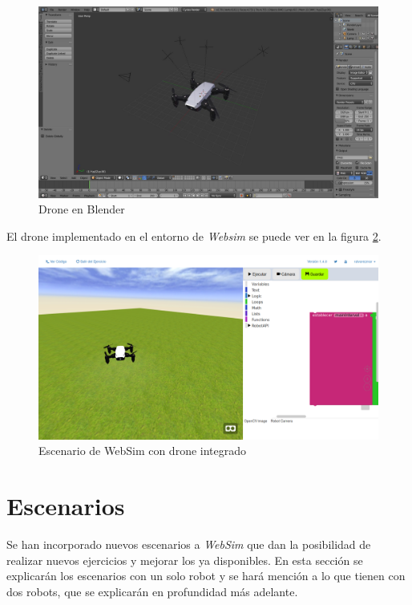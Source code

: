  \begin{figure}
    \centering
    \includegraphics[scale=0.3]{img/droneBlender.jpg}
    \caption{Drone en Blender} \label{fig:droneBlender}
\end{figure}

El drone implementado en el entorno de \textit{Websim} se puede ver en la figura \ref{fig:escenarioDrone}.
   \begin{figure}[H]
    \centering
    \includegraphics[scale=0.3]{img/websimDrone.png}
    \caption{Escenario de WebSim con drone integrado} \label{fig:escenarioDrone}
    \end{figure}


\section{Escenarios}

Se han incorporado nuevos escenarios a \textit{WebSim} que dan la posibilidad de realizar nuevos ejercicios y  mejorar los ya disponibles. En esta sección se explicarán los escenarios con un solo robot y se hará mención a lo que tienen con dos robots, que se explicarán en profundidad más adelante.

